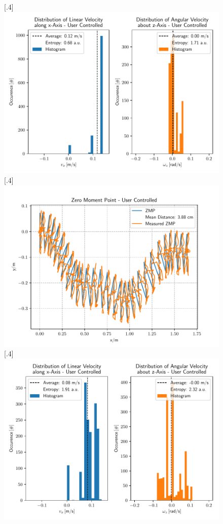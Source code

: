 \begin{figure}[h]
	[.4\linewidth]{\includegraphics[scale=.35]{chapters/05_experiments/03_user_controlled_walking/curved_walk_01_entropy.pdf}}
	[.4\linewidth]{\includegraphics[scale=.35]{chapters/05_experiments/03_user_controlled_walking/obstacle_walk_02_zmp.pdf}}
	[.4\linewidth]{\includegraphics[scale=.35]{chapters/05_experiments/03_user_controlled_walking/obstacle_walk_02_entropy.pdf}}

\end{figure}
